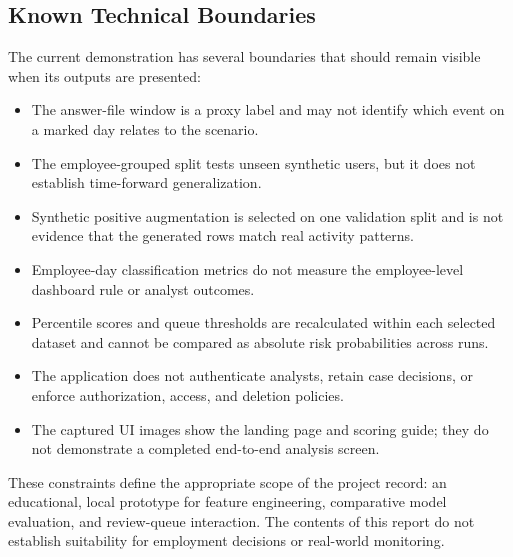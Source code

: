 \subsection{Known Technical Boundaries}
The current demonstration has several boundaries that should remain
visible when its outputs are presented:
\begin{itemize}
  \item The answer-file window is a proxy label and may not identify
        which event on a marked day relates to the scenario.
  \item The employee-grouped split tests unseen synthetic users, but it
        does not establish time-forward generalization.
  \item Synthetic positive augmentation is selected on one validation
        split and is not evidence that the generated rows match real
        activity patterns.
  \item Employee-day classification metrics do not measure the
        employee-level dashboard rule or analyst outcomes.
  \item Percentile scores and queue thresholds are recalculated within
        each selected dataset and cannot be compared as absolute risk
        probabilities across runs.
  \item The application does not authenticate analysts, retain case
        decisions, or enforce authorization, access, and deletion
        policies.
  \item The captured UI images show the landing page and scoring guide;
        they do not demonstrate a completed end-to-end analysis screen.
\end{itemize}

These constraints define the appropriate scope of the project record:
an educational, local prototype for feature engineering, comparative
model evaluation, and review-queue interaction. The contents of this
report do not establish suitability for employment decisions or
real-world monitoring.
